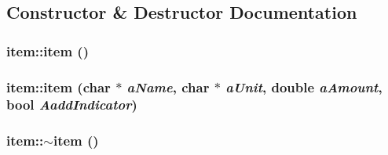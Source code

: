 \subsection{Constructor \& Destructor Documentation}
\hypertarget{classitem_a344fbf6e3db0d59e0c8ac75cd42ee144}{
\subsubsection[{item}]{\setlength{\rightskip}{0pt plus 5cm}item::item ()}}
\label{classitem_a344fbf6e3db0d59e0c8ac75cd42ee144}
\hypertarget{classitem_aab5a108ade3f674bc49cb1f1801eacb0}{
\subsubsection[{item}]{\setlength{\rightskip}{0pt plus 5cm}item::item (char $\ast$ {\em aName}, \/  char $\ast$ {\em aUnit}, \/  double {\em aAmount}, \/  bool {\em AaddIndicator})}}
\label{classitem_aab5a108ade3f674bc49cb1f1801eacb0}
\hypertarget{classitem_ae1792174ea9d664d6413f5ad0de38d74}{
\subsubsection[{$\sim$item}]{\setlength{\rightskip}{0pt plus 5cm}item::$\sim$item ()}}
\label{classitem_ae1792174ea9d664d6413f5ad0de38d74}


